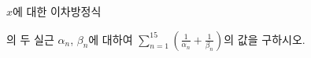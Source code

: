 \hspace*{2mm}\begin{minipage}[t]{\dimexpr\linewidth-2mm\relax}\vspace{0pt}
$x$에 대한 이차방정식 \par\smallskip{}\par\smallskip\noindent 의 두 실근 $\alpha_n$, $\beta_n$에 대하여 $\displaystyle\sum_{n=1}^{15}\left(\frac{1}{\alpha_n}+\frac{1}{\beta_n}\right)$의 값을 구하시오.\end{minipage}
